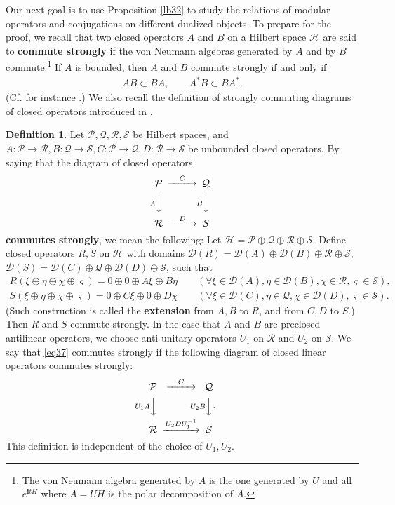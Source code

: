 \documentclass[12pt,a4paper]{article}
\theoremstyle{definition}
\newtheorem{df}{Definition}[section]
\theoremstyle{plain}
\newcommand{\mc}{\mathcal}
\newcommand{\Dom}{\scr D}
\newcommand{\scr}{\mathscr}
\newcommand{\im}{\mathbf{i}}
\numberwithin{equation}{section}
\begin{document}
Our next goal is to use Proposition \ref{lb32} to study the relations of modular operators and conjugations on different dualized objects. To prepare for the proof, we recall that two closed operators $A$ and $B$ on a Hilbert space $\mc H$ are said to \textbf{commute strongly} if the von Neumann algebras generated by $A$ and by $B$ commute.\footnote{The von Neumann algebra generated by $A$ is the one generated by $U$ and all $e^{\im tH}$ where $A=UH$ is the polar decomposition of $A$.} If $A$ is bounded, then $A$ and $B$ commute strongly if and only if
\begin{align}
AB\subset BA,\qquad A^*B\subset BA^*.	
\end{align}
(Cf. for instance \cite[Sec. B.1]{Gui19}.) We also recall the definition of strongly commuting diagrams of closed operators introduced in \cite{Gui21a}.
\begin{df}
	Let $\mc P,\mc Q, \mc R,\mc S$ be Hilbert spaces, and  $A:\mc P\rightarrow\mc R,B:\mc Q\rightarrow\mc S,C:\mc P\rightarrow\mc Q,D:\mc R\rightarrow\mc S$ be unbounded closed operators. By saying that the diagram of closed operators
	\begin{align}
		\begin{CD}
			\mc P @>C>> \mc Q\\
			@V A VV @V B VV\\
			\mc R @>D>> \mc S
		\end{CD}\label{eq37}
	\end{align}
	\textbf{commutes strongly}, we mean the following: Let $\mc H=\mc P\oplus\mc Q\oplus\mc R\oplus\mc S$. Define closed operators $R,S$ on $\mc H$ with domains $\Dom(R)=\Dom(A)\oplus\Dom(B)\oplus\mc R\oplus \mc S$, $\Dom(S)=\Dom(C)\oplus\mc Q\oplus\Dom(D)\oplus \mc S$, such that
	\begin{gather*}
		R(\xi\oplus\eta\oplus\chi\oplus\varsigma)=0\oplus 0\oplus A\xi\oplus B\eta\qquad(\forall \xi\in\Dom(A),\eta\in\Dom(B),\chi\in\mc R,\varsigma\in \mc S),\\
		S(\xi\oplus\eta\oplus\chi\oplus\varsigma)=0\oplus C\xi\oplus 0\oplus D\chi   \qquad(\forall \xi\in\Dom(C),\eta\in\mc Q,\chi\in \Dom(D),\varsigma\in\mc S).
	\end{gather*}
	(Such construction is called the \textbf{extension} from $A,B$ to $R$, and from $C,D$ to $S$.) Then  $R$ and $S$ commute strongly. In the case that $A$ and $B$ are preclosed antilinear operators, we choose anti-unitary operators $U_1$ on $\mc R$ and $U_2$ on $\mc S$. We say that \eqref{eq37} commutes strongly if the following diagram of closed linear operators commutes strongly:
	\begin{align}
		\begin{CD}
			\mc P @>C>> \mc Q\\
			@V U_1A VV @V U_2B VV\\
			\mc R @>U_2DU_1^{-1}>> \mc S
		\end{CD}.
	\end{align}
	This definition is independent of the choice of $U_1,U_2$.
\end{df} 
\end{document}

